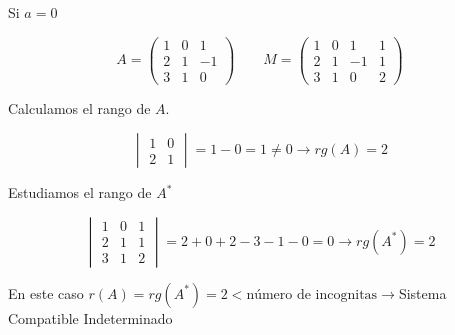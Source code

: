 \documentclass[9pt]{beamer}
\begin{document}
\begin{frame}
Si $a=0$ 

\[ A=\begin{pmatrix}
	1 & 0 & 1 \\
	2 & 1 & -1 \\
	3 & 1 & 0
\end{pmatrix}
\qquad
M=\begin{pmatrix}
	1 & 0 & 1 & 1 \\
	2 & 1 & -1 & 1 \\
	3 & 1 & 0 & 2
\end{pmatrix} 
\]

\pause
Calculamos el rango de $A$.

\[ \begin{vmatrix}
	 1 & 0 \\
 	2 & 1
\end{vmatrix}= 1-0=1 \neq 0 \rightarrow rg(A)=2\]

\pause
Estudiamos el rango de $A^*$

\[ \begin{vmatrix}
	1 & 0& 1 \\
	2 & 1 & 1 \\
	3 & 1 & 2
\end{vmatrix}= 2+0+2-3-1-0=0 \rightarrow rg(A^*)=2
\]

\pause
En este caso $r(A)=rg(A^*)=2 < \text{número de incognitas} \rightarrow$Sistema Compatible Indeterminado
\end{frame}
\end{document}
